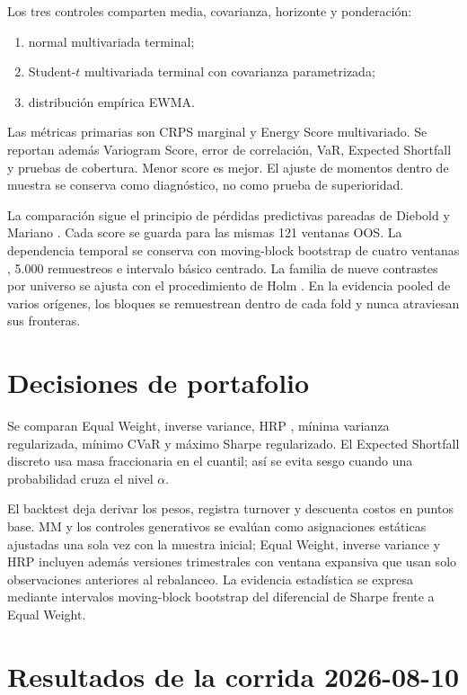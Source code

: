 \documentclass[11pt,letterpaper]{article}
\begin{document}
Los tres controles comparten media, covarianza, horizonte y ponderación:
\begin{enumerate}
 \item normal multivariada terminal;
 \item Student-$t$ multivariada terminal con covarianza parametrizada;
 \item distribución empírica EWMA.
\end{enumerate}

Las métricas primarias son CRPS marginal y Energy Score multivariado. Se reportan
además Variogram Score, error de correlación, VaR, Expected Shortfall y pruebas de
cobertura. Menor score es mejor. El ajuste de momentos dentro de muestra se conserva
como diagnóstico, no como prueba de superioridad.

La comparación sigue el principio de pérdidas predictivas pareadas de Diebold y
Mariano \cite{diebold1995}. Cada score se guarda para las mismas 121 ventanas OOS.
La dependencia temporal se conserva con moving-block bootstrap de cuatro ventanas
\cite{kunsch1989}, 5.000 remuestreos e intervalo básico centrado. La familia de nueve
contrastes por universo se ajusta con el procedimiento de Holm \cite{holm1979}.
En la evidencia pooled de varios orígenes, los bloques se remuestrean dentro de cada
fold y nunca atraviesan sus fronteras.

\section{\texorpdfstring{\enspace}{}Decisiones de portafolio}

Se comparan Equal Weight, inverse variance, HRP \cite{lopez2016}, mínima varianza
regularizada, mínimo CVaR \cite{rockafellar2000} y máximo Sharpe regularizado. El
Expected Shortfall discreto usa masa fraccionaria en el cuantil; así se evita sesgo
cuando una probabilidad cruza el nivel $\alpha$.

El backtest deja derivar los pesos, registra turnover y descuenta costos en puntos
base. MM y los controles generativos se evalúan como asignaciones estáticas ajustadas
una sola vez con la muestra inicial; Equal Weight, inverse variance y HRP incluyen
además versiones trimestrales con ventana expansiva que usan solo observaciones
anteriores al rebalanceo. La evidencia estadística se expresa mediante intervalos
moving-block bootstrap del diferencial de Sharpe frente a Equal Weight.

\section{Resultados de la corrida 2026-08-10}
\end{document}
